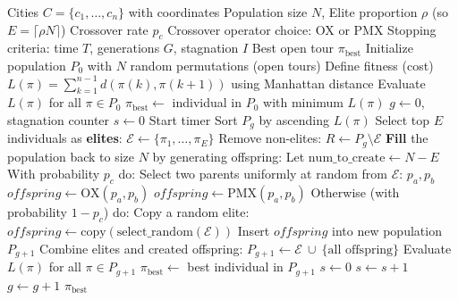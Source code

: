 \documentclass{scrartcl}
\begin{document}
\begin{algorithm}[H]
\caption{Evolutionary Algorithm for Open TSP (path length as fitness)}
\begin{algorithmic}[0]
\REQUIRE Cities \(C=\{c_1,\dots,c_n\}\) with coordinates
\REQUIRE Population size \(N\), Elite proportion \(\rho\) (so \(E=\lceil \rho N\rceil\))
\REQUIRE Crossover rate \(p_c\)
\REQUIRE Crossover operator choice: OX or PMX
\REQUIRE Stopping criteria: time \(T\), generations \(G\), stagnation \(I\)
\ENSURE Best open tour \(\pi_{\text{best}}\)
\STATE Initialize population \(P_0\) with \(N\) random permutations (open tours)
\STATE Define fitness (cost) \(L(\pi)=\sum_{k=1}^{n-1} d(\pi(k),\pi(k+1))\) using Manhattan distance
\STATE Evaluate \(L(\pi)\) for all \(\pi\in P_0\)
\STATE \(\pi_{\text{best}}\gets\) individual in \(P_0\) with minimum \(L(\pi)\)
\STATE \(g\gets 0\), stagnation counter \(s\gets 0\)
\STATE Start timer
  \STATE Sort \(P_g\) by ascending \(L(\pi)\)
  \STATE Select top \(E\) individuals as \textbf{elites}: \(\mathcal{E} \gets \{\pi_1,\dots,\pi_E\}\)
  \STATE Remove non-elites: \(R \gets P_g \setminus \mathcal{E}\)
  \STATE \textbf{Fill} the population back to size \(N\) by generating offspring:
  \STATE \quad Let \(\text{num\_to\_create} \gets N - E\)
    \STATE With probability \(p_c\) do:
      \STATE \quad Select two parents uniformly at random from \(\mathcal{E}\): \(p_a,p_b\)
        \STATE \quad $offspring \gets \mathrm{OX}(p_a,p_b)$
        \STATE \quad $offspring \gets \mathrm{PMX}(p_a,p_b)$
      \ENDIF
    \STATE Otherwise (with probability \(1-p_c\)) do:
      \STATE \quad Copy a random elite: $offspring \gets \mathrm{copy}(\mathrm{select\_random}(\mathcal{E}))$
    \STATE Insert $offspring$ into new population $P_{g+1}$
  \ENDFOR
  \STATE Combine elites and created offspring: $P_{g+1} \gets \mathcal{E}\ \cup\ \{\text{all offspring}\}$
  \STATE Evaluate $L(\pi)$ for all $\pi\in P_{g+1}$
    \STATE \quad $\pi_{\text{best}}\gets$ best individual in $P_{g+1}$
    \STATE \quad $s\gets 0$
  \ELSE
    \STATE \quad $s\gets s+1$
  \ENDIF
  \STATE $g\gets g+1$
\ENDWHILE
\STATE \RETURN $\pi_{\text{best}}$
\end{algorithmic}
\end{algorithm}
\end{document}
